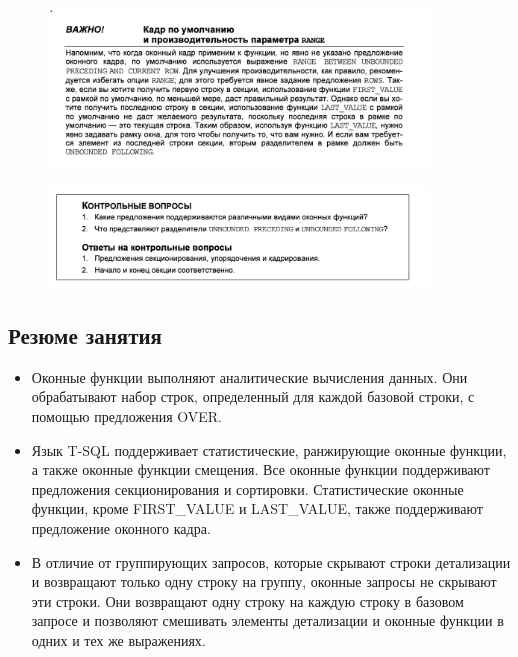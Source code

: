 \begin{figure}[h!]
	\begin{center}
		\includegraphics[width=0.9\textwidth]{img/warn4.png}
	\end{center}
	\captionsetup{justification=centering}
\end{figure}


\begin{figure}[h!]
	\begin{center}
		\includegraphics[width=0.9\textwidth]{img/control16.png}
	\end{center}
	\captionsetup{justification=centering}
\end{figure}



\subsection*{Резюме занятия}
\begin{itemize}
	\item Оконные функции выполняют аналитические вычисления данных. Они обрабатывают набор строк, определенный для каждой базовой строки, с помощью
	предложения OVER. 
	\item Язык T-SQL поддерживает статистические, ранжирующие оконные функции,
	а также оконные функции смещения. Все оконные функции поддерживают
	предложения секционирования и сортировки. Статистические оконные функции, кроме FIRST\_VALUE и LAST\_VALUE, также поддерживают предложение оконного кадра. 
	\item В отличие от группирующих запросов, которые скрывают строки детализации и
	возвращают только одну строку на группу, оконные запросы не скрывают эти
	строки. Они возвращают одну строку на каждую строку в базовом запросе и позволяют смешивать элементы детализации и оконные функции в одних и тех же
	выражениях. 
\end{itemize}

